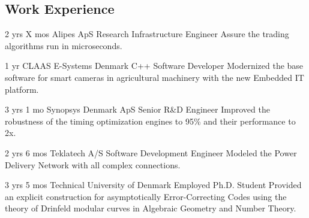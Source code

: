 \documentclass[11pt]{article} %
\begin{document}
\begin{paracol}{2}
\switchcolumn

\section{Work Experience}




{2 yrs X mos} %
{Alipes ApS} %
{Research Infrastructure Engineer} %
{Assure the trading algorithms run in microseconds.
} %

{1 yr} %
{CLAAS E-Systems Denmark} %
{C++ Software Developer} %
{Modernized the base software for smart cameras in agricultural machinery with the new Embedded IT platform.
} %


{3 yrs 1 mo} %
{Synopsys Denmark ApS} %
{Senior R\&D Engineer} %
{Improved the robustness of the timing optimization engines to 95\% and their performance to 2x.
} %


{2 yrs 6 mos} %
{Teklatech A/S} %
{Software Development Engineer} %
{Modeled the Power Delivery Network with all complex connections.}  %


{3 yrs 5 mos} %
{Technical University of Denmark} %
{Employed Ph.D. Student} %
{Provided an explicit construction for asymptotically Error-Correcting Codes using the theory of Drinfeld modular curves in Algebraic Geometry and Number Theory.} %


\end{paracol}
\end{document}
